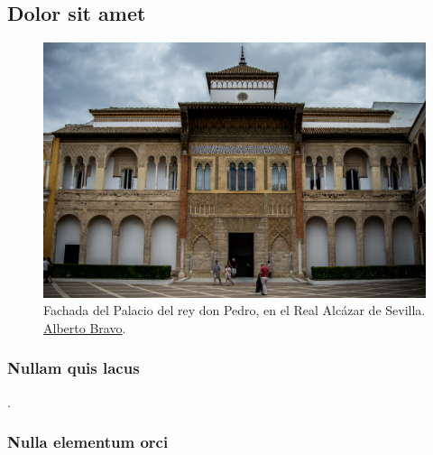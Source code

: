 \newpage

\subsection{Dolor sit amet}

\lipsum[14-16]

\begin{figure}
    \centering
    \includegraphics[width=\linewidth]{figures/examples/example3.jpg}
    \caption[Fachada del Palacio del rey don Pedro, en el Real Alcázar de Sevilla.]{Fachada del Palacio del rey don Pedro, en el Real Alcázar de Sevilla. \href{https://commons.wikimedia.org/wiki/File:Fachada_del_Palacio_del_rey_don_Pedro.jpg}{Alberto Bravo}.}
    \label{fig:cha1:donpedro}
\end{figure}

\lipsum[17]

\subsubsection{Nullam quis lacus}

\lipsum[18-20] \cite{lora-hw-e539v03a}. 

\subsubsection{Nulla elementum orci}

\lipsum[21]

